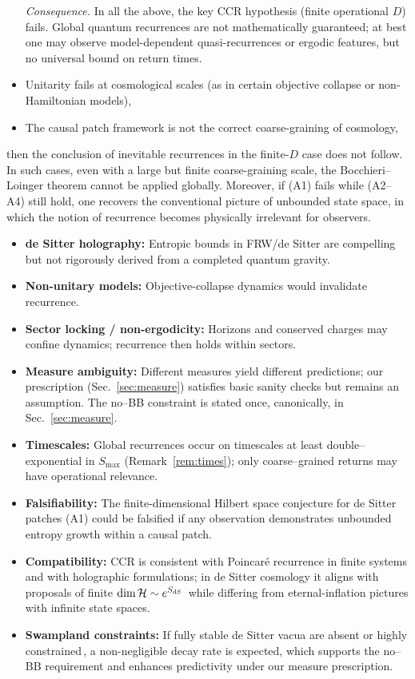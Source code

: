 \documentclass[12pt]{article}
\newcommand{\Smax}{S_{\max}}
\theoremstyle{remark}
\begin{document}
\begin{itemize}
\noindent\emph{Consequence.} In all the above, the key CCR hypothesis (finite operational $D$) fails.
Global quantum recurrences are not mathematically guaranteed; at best one may observe model-dependent
quasi-recurrences or ergodic features, but no universal bound on return times.

    
    \item Unitarity fails at cosmological scales (as in certain objective collapse or non-Hamiltonian models),
    \item The causal patch framework is not the correct coarse-graining of cosmology,
\end{itemize}
then the conclusion of inevitable recurrences in the finite-$D$ case does not follow.
In such cases, even with a large but finite coarse-graining scale, the Bocchieri–Loinger theorem cannot be applied globally.
Moreover, if (A1) fails while (A2–A4) still hold, one recovers the conventional picture of unbounded state space, in which the notion of recurrence becomes physically irrelevant for observers.


\begin{itemize}
    \item \textbf{de Sitter holography:} Entropic bounds in FRW/de Sitter are compelling but not rigorously derived from a completed quantum gravity.
    \item \textbf{Non-unitary models:} Objective-collapse dynamics would invalidate recurrence.
    \item \textbf{Sector locking / non-ergodicity:} Horizons and conserved charges may confine dynamics; recurrence then holds within sectors.
    \item \textbf{Measure ambiguity:} Different measures yield different predictions; our prescription (Sec.~\ref{sec:measure}) satisfies basic sanity checks but remains an assumption. The no--BB constraint is stated once, canonically, in Sec.~\ref{sec:measure}.
    \item \textbf{Timescales:} Global recurrences occur on timescales at least double--exponential in $\Smax$ (Remark~\ref{rem:times}); only coarse--grained returns may have operational relevance.
    \item \textbf{Falsifiability:} The finite-dimensional Hilbert space conjecture for de Sitter patches (A1) could be falsified if any observation demonstrates unbounded entropy growth within a causal patch.
    \item \textbf{Compatibility:} CCR is consistent with Poincar\'e recurrence in finite systems and with holographic formulations; in de Sitter cosmology it aligns with proposals of finite $\dim\mathcal H\sim e^{S_{\rm dS}}$\,\cite{BanksFischler2001,BanksFischler2003} while differing from eternal-inflation pictures with infinite state spaces.
    \item \textbf{Swampland constraints:} If fully stable de Sitter vacua are absent or highly constrained\,\cite{Obied2018,Ooguri2019}, a non-negligible decay rate is expected, which supports the no--BB requirement and enhances predictivity under our measure prescription.
\end{itemize}
\end{document}
